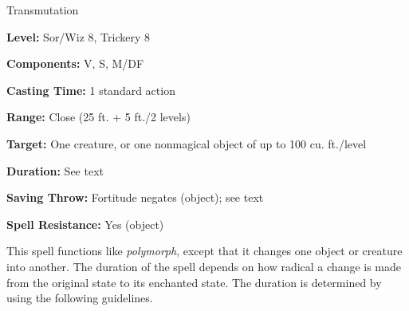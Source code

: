 
Transmutation

\textbf{Level:} Sor/Wiz 8, Trickery 8

\textbf{Components:} V, S, M/DF

\textbf{Casting Time:} 1 standard action

\textbf{Range:} Close (25 ft. + 5 ft./2 levels)

\textbf{Target:} One creature, or one nonmagical object of up to 100 cu. ft./level

\textbf{Duration:} See text

\textbf{Saving Throw:} Fortitude negates (object); see text

\textbf{Spell Resistance:} Yes (object)

This spell functions like \textit{polymorph}, except that it changes one object 
or creature into another. The duration of the spell depends on how radical a change 
is made from the original state to its enchanted state. The duration is determined 
by using the following guidelines.

